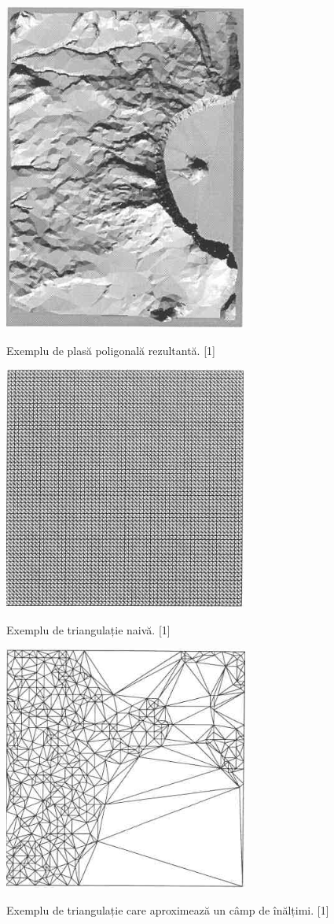 \documentclass[12pt]{article}
\begin{document}
\begin{figure}[h!]
	\caption{Exemplu de plasă poligonală rezultantă. [1]}
	\centering
	\includegraphics[width=0.4\linewidth]{ExempluPlasa.png}
	\label{fig:fig1}
\end{figure}

\begin{figure}[h!]
	\caption{Exemplu de triangulație naivă. [1]}
	\centering
	\includegraphics[width=0.6\linewidth]{ExempluTriangulatieNaiva.png}
	\label{fig:fig2}
\end{figure}

\begin{figure}[h!]
	\caption{Exemplu de triangulație care aproximează un câmp de înălțimi. [1]}
	\centering
	\includegraphics[width=0.6\linewidth]{ExempluTriangulatieCuAproximari.png}
	\label{fig:fig3}
\end{figure}
\end{document}
